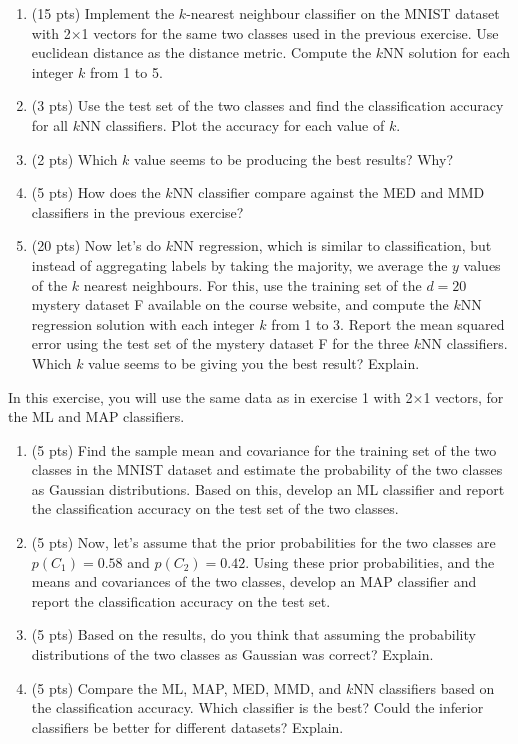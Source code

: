 \documentclass[10pt,letter,notitlepage]{article}
\newcounter{exercise}
\begin{document}
\begin{exercise} 

\begin{enumerate}
    \item (15 pts) Implement the $k$-nearest neighbour classifier on the MNIST dataset with 2$\times$1 vectors for the same two classes used in the previous exercise. Use euclidean distance as the distance metric. Compute the $k$NN solution for each integer $k$ from 1 to 5. 
    \item (3 pts) Use the test set of the two classes and find the classification accuracy for all $k$NN classifiers. Plot the accuracy for each value of $k$. 
    \item (2 pts) Which $k$ value seems to be producing the best results? Why?
    \item (5 pts) How does the $k$NN classifier compare against the MED and MMD classifiers in the previous exercise?
    \item (20 pts) Now let's do $k$NN regression, which is similar to classification, but instead of aggregating labels by taking the majority, we average the $y$ values of the $k$ nearest neighbours. For this, use the training set of the $d=20$ mystery dataset F available on the course website, and compute the $k$NN regression solution with each integer $k$ from 1 to 3. Report the mean squared error using the test set of the mystery dataset F for the three $k$NN classifiers. Which $k$ value seems to be giving you the best result? Explain.
\end{enumerate}
\end{exercise}

\newpage
\begin{exercise}
In this exercise, you will use the same data as in exercise 1 with 2$\times$1 vectors, for the ML and MAP classifiers.

\begin{enumerate}
\item (5 pts) Find the sample mean and covariance for the training set of the two classes in the MNIST dataset and estimate the probability of the two classes as Gaussian distributions. Based on this, develop an ML classifier and report the classification accuracy on the test set of the two classes.

\item (5 pts) Now, let's assume that the prior probabilities for the two classes are $p(C_1)=0.58$ and $p(C_2) = 0.42$. Using these prior probabilities, and the means and covariances of the two classes, develop an MAP classifier and report the classification accuracy on the test set.

\item (5 pts) Based on the results, do you think that assuming the probability distributions of the two classes as Gaussian was correct? Explain.

\item (5 pts) Compare the ML, MAP, MED, MMD, and $k$NN classifiers based on the classification accuracy. Which classifier is the best? Could the inferior classifiers be better for different datasets? Explain.
\end{enumerate}
\end{exercise}
\end{document}
